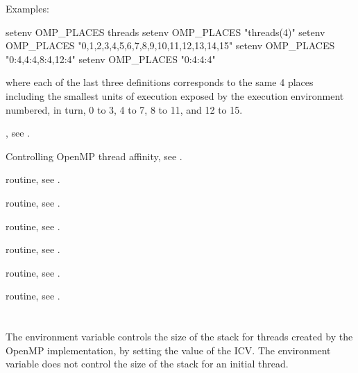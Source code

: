 \begin{samepage}
Examples:
\begin{ompEnv}
setenv OMP_PLACES threads
setenv OMP_PLACES "threads(4)"
setenv OMP_PLACES "{0,1,2,3},{4,5,6,7},{8,9,10,11},{12,13,14,15}"
setenv OMP_PLACES "{0:4},{4:4},{8:4},{12:4}"
setenv OMP_PLACES "{0:4}:4:4"
\end{ompEnv}
\end{samepage}

where each of the last three definitions corresponds to the same 4 places
including the smallest units of execution exposed by the execution environment
numbered, in turn, 0 to 3, 4 to 7, 8 to 11, and 12 to 15.

\begin{crossrefs}
\item {}, see .

\item Controlling OpenMP thread affinity,
see .

\item {} routine, see .

\item {} routine,
see .

\item {} routine,
see .

\item {} routine, see .

\item {} routine,
see .

\item {} routine,
see .
\end{crossrefs}



\section{}
\label{sec:OMP_STACKSIZE}
The  environment variable controls the size of the
stack for threads created by the OpenMP implementation, by setting the
value of the  ICV. The environment variable does not
control the size of the stack for an initial thread.

